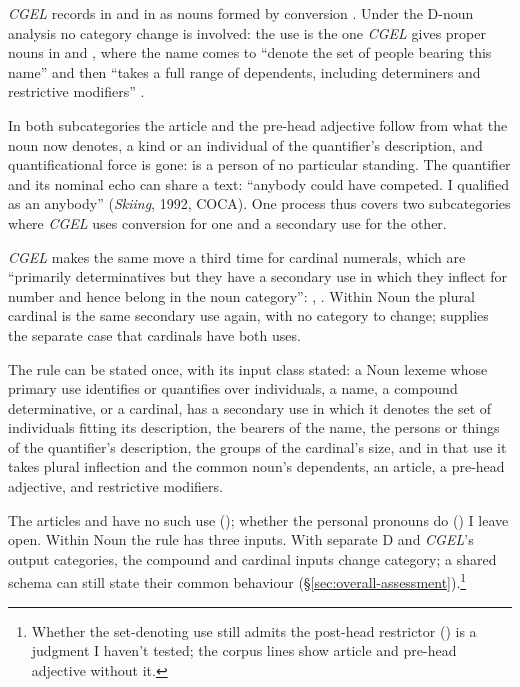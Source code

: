 \documentclass[12pt]{article}
\begin{document}
\textit{CGEL} records  in  and  in  as nouns formed by conversion \citep[423, n.~43]{huddleston2002}. Under the D-noun analysis no category change is involved: the use is the one \textit{CGEL} gives proper nouns in  and , where the name comes to \enquote{denote the set of people bearing this name} and then \enquote{takes a full range of dependents, including determiners and restrictive modifiers} \citep[521]{huddleston2002}.

In both subcategories the article and the pre-head adjective follow from what the noun now denotes, a kind or an individual of the quantifier's description, and quantificational force is gone:  is a person of no particular standing. The quantifier and its nominal echo can share a text: \enquote{anybody could have competed. I qualified as an anybody} (\textit{Skiing}, 1992, COCA). One process thus covers two subcategories where \textit{CGEL} uses conversion for one and a secondary use for the other.

\textit{CGEL} makes the same move a third time for cardinal numerals, which are \enquote{primarily determinatives but they have a secondary use in which they inflect for number and hence belong in the noun category}: ,  \citep[385]{huddleston2002}. Within Noun the plural cardinal is the same secondary use again, with no category to change; \textcite{reynolds2026numerals} supplies the separate case that cardinals have both uses.

The rule can be stated once, with its input class stated: a Noun lexeme whose primary use identifies or quantifies over individuals, a name, a compound determinative, or a cardinal, has a secondary use in which it denotes the set of individuals fitting its description, the bearers of the name, the persons or things of the quantifier's description, the groups of the cardinal's size, and in that use it takes plural inflection and the common noun's dependents, an article, a pre-head adjective, and restrictive modifiers.

The articles and  have no such use (); whether the personal pronouns do () I leave open. Within Noun the rule has three inputs. With separate D and \textit{CGEL}'s output categories, the compound and cardinal inputs change category; a shared schema can still state their common behaviour (§\ref{sec:overall-assessment}).\footnote{Whether the set-denoting use still admits the post-head restrictor () is a judgment I haven't tested; the corpus lines show article and pre-head adjective without it.}
\end{document}
